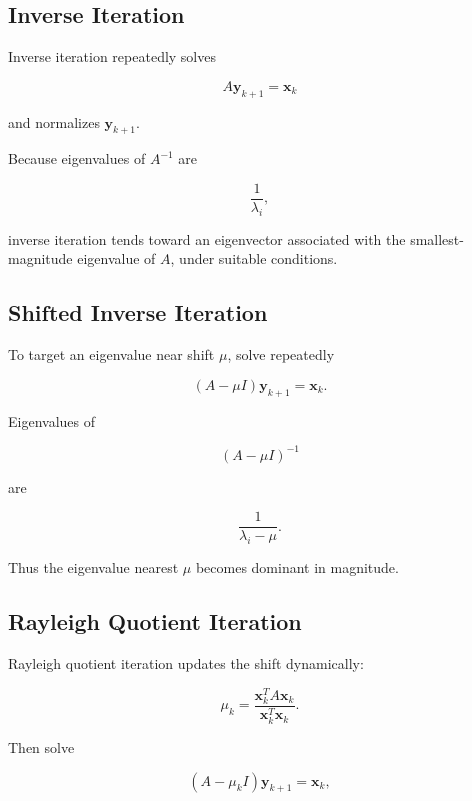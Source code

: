 \subsection{Inverse Iteration}
\label{subsec:inverse-iteration}

Inverse iteration repeatedly solves

\[
\boxed{
A\mathbf{y}_{k+1}
=
\mathbf{x}_k
}
\]

and normalizes \(\mathbf{y}_{k+1}\).

Because eigenvalues of \(A^{-1}\) are

\[
\frac1{\lambda_i},
\]

inverse iteration tends toward an eigenvector associated with the
smallest-magnitude eigenvalue of \(A\), under suitable conditions.

\subsection{Shifted Inverse Iteration}
\label{subsec:shifted-inverse-iteration}

To target an eigenvalue near shift \(\mu\), solve repeatedly

\[
\boxed{
(A-\mu I)
\mathbf{y}_{k+1}
=
\mathbf{x}_k.
}
\]

Eigenvalues of

\[
(A-\mu I)^{-1}
\]

are

\[
\frac1{\lambda_i-\mu}.
\]

Thus the eigenvalue nearest \(\mu\) becomes dominant in magnitude.

\subsection{Rayleigh Quotient Iteration}
\label{subsec:rayleigh-quotient-iteration}

Rayleigh quotient iteration updates the shift dynamically:

\[
\boxed{
\mu_k
=
\frac{
\mathbf{x}_k^TA\mathbf{x}_k
}{
\mathbf{x}_k^T\mathbf{x}_k
}.
}
\]

Then solve

\[
\boxed{
(A-\mu_kI)
\mathbf{y}_{k+1}
=
\mathbf{x}_k,
}
\]

